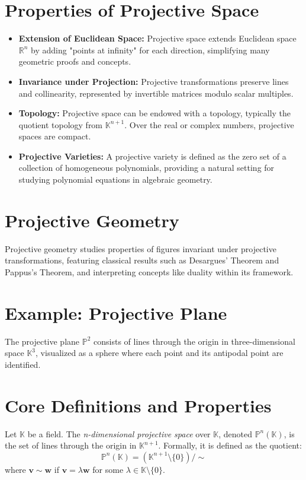 \documentclass[11pt,openany]{article}
\begin{document}
\section*{Properties of Projective Space}

\begin{itemize}
	\item \textbf{Extension of Euclidean Space:} Projective space extends Euclidean space \( \mathbb{R}^n \) by adding "points at infinity" for each direction, simplifying many geometric proofs and concepts.
	\item \textbf{Invariance under Projection:} Projective transformations preserve lines and collinearity, represented by invertible matrices modulo scalar multiples.
	\item \textbf{Topology:} Projective space can be endowed with a topology, typically the quotient topology from \( \mathbb{K}^{n+1} \). Over the real or complex numbers, projective spaces are compact.
	\item \textbf{Projective Varieties:} A projective variety is defined as the zero set of a collection of homogeneous polynomials, providing a natural setting for studying polynomial equations in algebraic geometry.
\end{itemize}

\section*{Projective Geometry}

Projective geometry studies properties of figures invariant under projective transformations, featuring classical results such as Desargues' Theorem and Pappus's Theorem, and interpreting concepts like duality within its framework.

\section*{Example: Projective Plane}

The projective plane \( \mathbb{P}^2 \) consists of lines through the origin in three-dimensional space \( \mathbb{K}^3 \), visualized as a sphere where each point and its antipodal point are identified.

\section*{Core Definitions and Properties}

\begin{definition}
	Let \( \mathbb{K} \) be a field. The \textit{n-dimensional projective space} over \( \mathbb{K} \), denoted \( \mathbb{P}^n(\mathbb{K}) \), is the set of lines through the origin in \( \mathbb{K}^{n+1} \). Formally, it is defined as the quotient:
	\[
	\mathbb{P}^n(\mathbb{K}) = (\mathbb{K}^{n+1} \setminus \{0\}) / \sim
	\]
	where \( \mathbf{v} \sim \mathbf{w} \) if \( \mathbf{v} = \lambda \mathbf{w} \) for some \( \lambda \in \mathbb{K} \setminus \{0\} \).
\end{definition}
\end{document}

